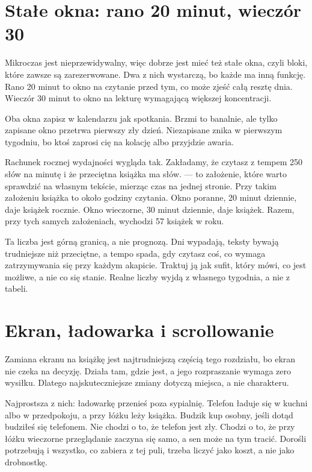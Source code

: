 \section{Stałe okna: rano 20 minut, wieczór 30}

Mikroczas jest nieprzewidywalny, więc dobrze jest mieć też stałe okna, czyli bloki, które zawsze
są zarezerwowane. Dwa z nich wystarczą, bo każde ma inną funkcję. Rano 20 minut to okno na
czytanie przed tym, co może zjeść całą resztę dnia. Wieczór 30 minut to okno na lekturę
wymagającą większej koncentracji.

Oba okna zapisz w kalendarzu jak spotkania. Brzmi to banalnie, ale tylko zapisane okno przetrwa
pierwszy zły dzień. Niezapisane znika w pierwszym tygodniu, bo ktoś zaprosi cię na kolację albo
przyjdzie awaria.

Rachunek rocznej wydajności wygląda tak. Zakładamy, że czytasz z tempem 250 słów na minutę
i że przeciętna książka ma  słów.  --- to założenie, które warto sprawdzić na własnym tekście, mierząc
czas na jednej stronie. Przy takim założeniu książka to około  godziny czytania.
Okno poranne, 20 minut dziennie, daje  książek rocznie. Okno wieczorne,
30 minut dziennie, daje  książek. Razem, przy tych samych założeniach,
wychodzi 57 książek w roku.

Ta liczba jest górną granicą, a nie prognozą. Dni wypadają, teksty bywają trudniejsze niż
przeciętne, a tempo spada, gdy czytasz coś, co wymaga zatrzymywania się przy każdym akapicie.
Traktuj ją jak sufit, który mówi, co jest możliwe, a nie co się stanie. Realne liczby wyjdą z
własnego tygodnia, a nie z tabeli.

\section{Ekran, ładowarka i scrollowanie}

Zamiana ekranu na książkę jest najtrudniejszą częścią tego rozdziału, bo ekran nie czeka na
decyzję. Działa tam, gdzie jest, a jego rozpraszanie wymaga zero wysiłku. Dlatego najskuteczniejsze
zmiany dotyczą miejsca, a nie charakteru.

Najprostsza z nich: ładowarkę przenieś poza sypialnię. Telefon ładuje się w kuchni albo w przedpokoju,
a przy łóżku leży książka. Budzik kup osobny, jeśli dotąd budziłeś się telefonem. Nie chodzi o
to, że telefon jest zły. Chodzi o to, że przy łóżku wieczorne przeglądanie zaczyna się samo,
a sen może na tym tracić. Dorośli potrzebują 
i wszystko, co zabiera z tej puli, trzeba liczyć jako koszt, a nie jako drobnostkę.

